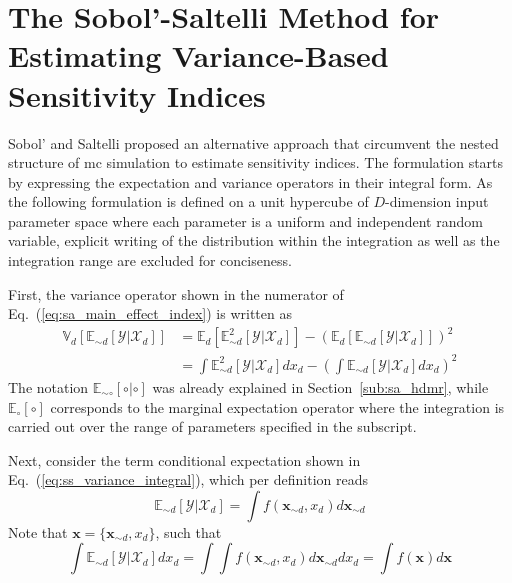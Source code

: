 \section{The Sobol'-Saltelli Method for Estimating Variance-Based Sensitivity Indices}\label{app:sobol_saltelli}

Sobol' \cite{Sobol2001} and Saltelli \cite{Saltelli2002} proposed an alternative approach that circumvent the nested structure of \gls{mc} simulation to estimate sensitivity indices.
The formulation starts by expressing the expectation and variance operators in their integral form.
As the following formulation is defined on a unit hypercube of $D$-dimension input parameter space where each parameter is a uniform and independent random variable,
explicit writing of the distribution within the integration as well as the integration range are excluded for conciseness.

First, the variance operator shown in the numerator of Eq.~(\ref{eq:sa_main_effect_index}) is written as
\begin{equation}
  \begin{split}
    \mathbb{V}_{d}[\mathbb{E}_{\sim d}[\mathcal{Y}|\mathcal{X}_d]] & = \mathbb{E}_{d}[\mathbb{E}_{\sim d}^{2}[\mathcal{Y}|\mathcal{X}_d]] - \left(\mathbb{E}_{d}[\mathbb{E}_{\sim d}[\mathcal{Y}|\mathcal{X}_d]]\right)^2 \\ 
                                               & = \int \mathbb{E}_{\sim d}^{2}[\mathcal{Y}|\mathcal{X}_d] dx_d - \left(\int \mathbb{E}_{\sim d}[\mathcal{Y}|\mathcal{X}_d] dx_d\right)^2
  \end{split}
\label{eq:ss_variance_integral}
\end{equation}
The notation $\mathbb{E}_{\sim \circ}[\circ | \circ]$ was already explained in Section~\ref{sub:sa_hdmr}, 
while $\mathbb{E}_{\circ} [\circ]$ corresponds to the marginal expectation operator 
where the integration is carried out over the range of parameters specified in the subscript. 

Next, consider the term conditional expectation shown in Eq.~(\ref{eq:ss_variance_integral}), which per definition reads
\begin{equation}
  \mathbb{E}_{\sim d} [\mathcal{Y}|\mathcal{X}_d] = \int f(\bm{x}_{\sim d}, x_d) d\bm{x}_{\sim d}
\label{eq:ss_expectation_integral}
\end{equation}
Note that $\bm{x} = \{\bm{x}_{\sim d}, x_d\}$, such that
\begin{equation}
  \int \mathbb{E}_{\sim d} [\mathcal{Y}|\mathcal{X}_d] dx_d = \int \int f(\bm{x}_{\sim d}, x_d) d\bm{x}_{\sim d} dx_{d} = \int f(\bm{x}) d\bm{x}
\label{eq:ss_expectation_expectation}
\end{equation}

